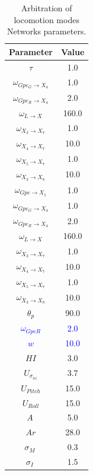 \documentclass[preprint,12pt]{elsarticle}
\newcommand{\revblue}[1]{\textcolor{blue}{#1}}
\begin{document}
\begin{table}[t]
\centering
\caption{Arbitration of locomotion modes Networks parameters.}
\begin{tabular}{|c|c|}
\hline
\textbf{Parameter} & \textbf{Value} \\ \hline
$\tau$ & 1.0 \\ \hline

$\omega_{Gpe_G \rightarrow X_4}$ & 1.0 \\ \hline
$\omega_{Gpe_R \rightarrow X_4}$ & 2.0 \\ \hline

$\omega_{L \rightarrow X}$ & 160.0 \\ \hline

$\omega_{X_3 \rightarrow X_7}$ & 1.0 \\ \hline
$\omega_{X_4 \rightarrow X_7}$ & 10.0 \\ \hline
$\omega_{X_5 \rightarrow X_7}$ & 1.0 \\ \hline

$\omega_{X_3 \rightarrow X_8}$ & 10.0 \\ \hline
$\omega_{Gpe \rightarrow X_1}$ & 1.0 \\ \hline

$\omega_{Gpe_G \rightarrow X_4}$ & 1.0 \\ \hline
$\omega_{Gpe_R \rightarrow X_4}$ & 2.0 \\ \hline

$\omega_{L \rightarrow X}$ & 160.0 \\ \hline



$\omega_{X_3 \rightarrow X_7}$ & 1.0 \\ \hline
$\omega_{X_4 \rightarrow X_7}$ & 10.0 \\ \hline
$\omega_{X_5 \rightarrow X_7}$ & 1.0 \\ \hline

$\omega_{X_3 \rightarrow X_8}$ & 10.0 \\ \hline

$\theta_{p}$ & 90.0 \\ \hline

\revblue{$\omega_{GpeR}$} & \revblue{2.0} \\ \hline
\revblue{$w$} & \revblue{10.0} \\ \hline

$HI$ & 3.0 \\ \hline

$U_{\sigma_{az}}$ & 3.7 \\ \hline
$U_{Pitch}$ & 15.0 \\ \hline
$U_{Roll}$ & 15.0 \\ \hline
$A\ $ & 5.0 \\ \hline
$ Ar $ & 28.0 \\ \hline
$\sigma_{M}\ $ & 0.3 \\ \hline
$\sigma_{I}\ $ & 1.5 \\ \hline
\end{tabular}
\label{table:Locom_NN}
\end{table}
\end{document}

